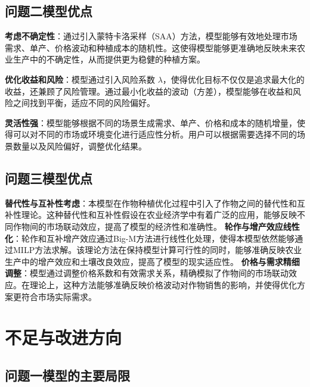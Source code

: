 \subsection[\hspace{-2pt}问题二模型优点]{{\heiti{} \hspace{-8pt}问题二模型优点}}\label{subsection5: 问题二模型优点}

\noindent\textbf{考虑不确定性}：通过引入蒙特卡洛采样（SAA）方法，模型能够有效地处理市场需求、单产、价格波动和种植成本的随机性。这使得模型能够更准确地反映未来农业生产中的不确定性，从而提供更为稳健的种植方案。

\noindent\textbf{优化收益和风险}：模型通过引入风险系数 $\lambda$，使得优化目标不仅仅是追求最大化的收益，还兼顾了风险管理。通过最小化收益的波动（方差），模型能够在收益和风险之间找到平衡，适应不同的风险偏好。

\noindent\textbf{灵活性强}：模型能够根据不同的场景生成需求、单产、价格和成本的随机增量，使得可以对不同的市场或环境变化进行适应性分析。用户可以根据需要选择不同的场景数量以及风险偏好，调整优化结果。

\subsection[\hspace{-2pt}问题三模型优点]{{\heiti{} \hspace{-8pt}问题三模型优点}}\label{subsection5: 问题三模型优点}

\noindent\textbf{替代性与互补性考虑}：本模型在作物种植优化过程中引入了作物之间的替代性和互补性理论。这种替代性和互补性假设在农业经济学中有着广泛的应用，能够反映不同作物间的市场联动效应，提高了模型的经济性和准确性。
\noindent\textbf{轮作与增产效应线性化}：轮作和互补增产效应通过Big-M方法进行线性化处理，使得本模型依然能够通过MILP方法求解。该理论方法在保持模型计算可行性的同时，能够准确反映农业生产中的增产效应和土壤改良效应，提高了模型的现实适应性。
\noindent\textbf{价格与需求精细调整}：模型通过调整价格系数和有效需求关系，精确模拟了作物间的市场联动效应。在理论上，这种方法能够准确反映价格波动对作物销售的影响，并使得优化方案更符合市场实际需求。
\section[\hspace{-2pt}不足与改进方向]{{\heiti{} \hspace{-8pt}不足与改进方向}}\label{section5: 不足与改进方向}

\subsection[\hspace{-2pt}问题一模型的主要局限]{{\heiti{} \hspace{-8pt}问题一模型的主要局限}}\label{subsection5: 问题一模型局限}

